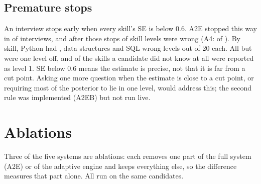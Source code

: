 \documentclass[10pt,a4paper]{article}
\begin{document}
\subsection{Premature stops}

An interview stops early when every skill's SE is below 0.6. A2E stopped this way in
\fConfStopsFull{} of \fN{} interviews, and after those stops \fConfWrongFull{} of \fConfSkillsFull{}
skill levels were wrong (A4: \fConfWrongAfour{} of \fConfSkillsAfour{}).
By skill, Python had \fConfWrongPyFull{}, data structures \fConfWrongDsFull{} and SQL
\fConfWrongSqlFull{} wrong levels out of 20 each. All but \fConfTwoOffFull{} were one level off, and
\fZeroWrongFull{} of the \fZeroFull{} skills a candidate did not know at all were reported as level 1.
SE below 0.6 means the estimate is precise, not that it is far from a cut point. Asking one more
question when the estimate is close to a cut point, or requiring most of the posterior to lie in one
level, would address this; the second rule was implemented (A2EB) but not run live.

\section{Ablations}
\label{sec:ablations}

Three of the five systems are ablations: each removes one part of the full system (A2E) or of the
adaptive engine and keeps everything else, so the difference measures that part alone. All run on
the same \fN{} candidates.
\end{document}
